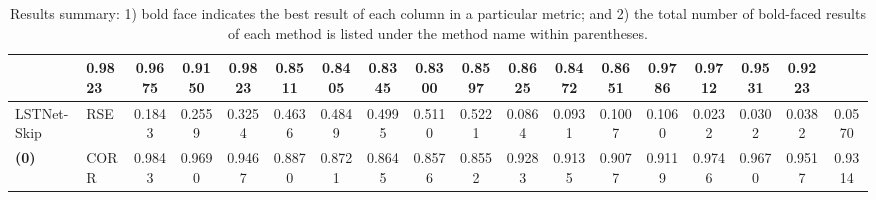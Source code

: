 \begin{table*}[!ht]
{\begin{tabular}{ll|cccc|cccc|cccc|cccc}
  & 0.9823 & 0.9675 & 0.9150 & 0.9823
  & 0.8511 & 0.8405 & 0.8345 & 0.8300
  & 0.8597 & 0.8625 & 0.8472 & 0.8651 
  & 0.9786 & 0.9712 & 0.9531 & 0.9223\\
\midrule
\multirow{}{*}{LSTNet-Skip}
  & RSE 
  & 0.1843 & 0.2559 & 0.3254 & 0.4636 
  & 0.4849 & 0.4995 & 0.5110 & 0.5221 
  & 0.0864 & 0.0931 & 0.1007 & 0.1060 
  & 0.0232 & 0.0302 & 0.0382 & 0.0570\\
  \textbf{(0)} & CORR 
  & 0.9843 & 0.9690 & 0.9467 & 0.8870
  & 0.8721 & 0.8645 & 0.8576 & 0.8552
  & 0.9283 & 0.9135 & 0.9077 & 0.9119 
  & 0.9746 & 0.9670 & 0.9517 & 0.9314\\
                                                
\bottomrule
\end{tabular}
}
\caption{Results summary: 1) bold face indicates the best result of each column in a particular metric; and 2) the total number of bold-faced results of each method is listed under the method name within parentheses. }
\label{tb:result}
\end{table*}

